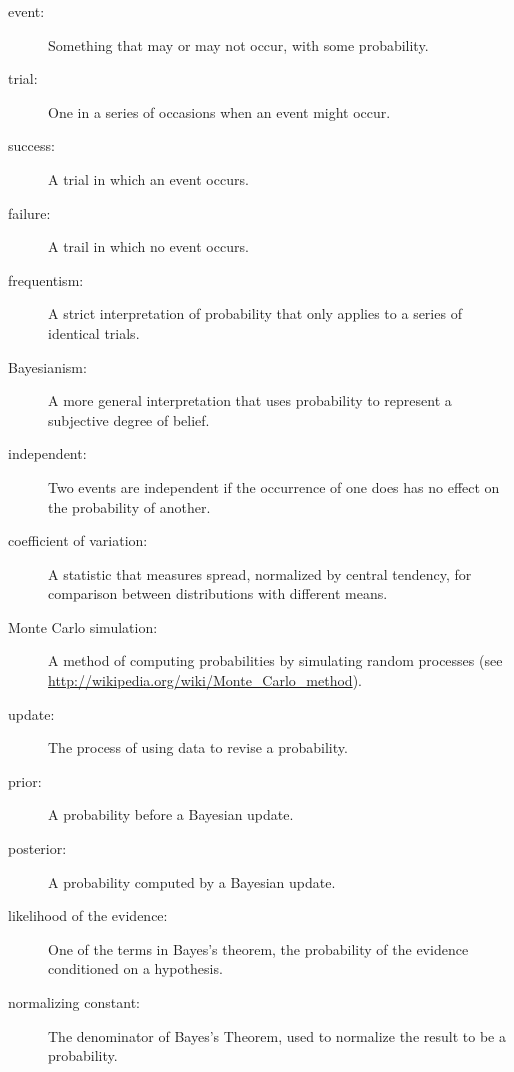\documentclass[12pt]{book}
\begin{document}
\begin{description}

\item[event:] Something that may or may not occur, with some probability.

\item[trial:] One in a series of occasions when an event might occur.

\item[success:] A trial in which an event occurs.

\item[failure:] A trail in which no event occurs.

\item[frequentism:] A strict interpretation of probability that only
applies to a series of identical trials.

\item[Bayesianism:] A more general interpretation that uses
probability to represent a subjective degree of belief.

\item[independent:] Two events are independent if the occurrence of
one does has no effect on the probability of another.

\item[coefficient of variation:] A statistic that measures spread,
normalized by central tendency, for comparison between distributions
with different means.

\item[Monte Carlo simulation:] A method of computing probabilities by
  simulating random processes (see
  \url{http://wikipedia.org/wiki/Monte_Carlo_method}).

\item[update:] The process of using data to revise a probability.

\item[prior:] A probability before a Bayesian update.

\item[posterior:] A probability computed by a Bayesian update.

\item[likelihood of the evidence:] One of the terms in Bayes's
  theorem, the probability of the evidence conditioned on a
  hypothesis.

\item[normalizing constant:] The denominator of Bayes's Theorem,
  used to normalize the result to be a probability.

\end{description}
\end{document}
